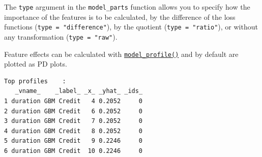\begin{tcolorbox}[enhanced jigsaw, opacitybacktitle=0.6, rightrule=.15mm, opacityback=0, arc=.35mm, breakable, titlerule=0mm, colframe=quarto-callout-tip-color-frame, coltitle=black, bottomrule=.15mm, toprule=.15mm, colback=white, colbacktitle=quarto-callout-tip-color!10!white, bottomtitle=1mm, toptitle=1mm, title=\textcolor{quarto-callout-tip-color}{\faLightbulb}\hspace{0.5em}{Calculating Importance}, leftrule=.75mm, left=2mm]

The \texttt{type} argument in the \texttt{model\_parts} function allows
you to specify how the importance of the features is to be calculated,
by the difference of the loss functions
(\texttt{type\ =\ "difference"}), by the quotient
(\texttt{type\ =\ "ratio"}), or without any transformation
(\texttt{type\ =\ "raw"}).

\end{tcolorbox}

Feature effects can be calculated with
\href{https://www.rdocumentation.org/packages/DALEX/topics/model_profile}{\texttt{model\_profile()}}
and by default are plotted as PD plots.

\begin{Shaded}
\begin{Highlighting}[]
\OtherTok{=} 
\end{Highlighting}
\end{Shaded}

\begin{verbatim}
Top profiles    : 
   _vname_    _label_ _x_ _yhat_ _ids_
1 duration GBM Credit   4 0.2052     0
2 duration GBM Credit   6 0.2052     0
3 duration GBM Credit   7 0.2052     0
4 duration GBM Credit   8 0.2052     0
5 duration GBM Credit   9 0.2246     0
6 duration GBM Credit  10 0.2246     0
\end{verbatim}

\begin{Shaded}
\begin{Highlighting}[]
\SpecialCharTok{+}
  \NormalTok{(} \NormalTok{) }\SpecialCharTok{+}
  \NormalTok{(}\NormalTok{,}\NormalTok{)}
\end{Highlighting}
\end{Shaded}

